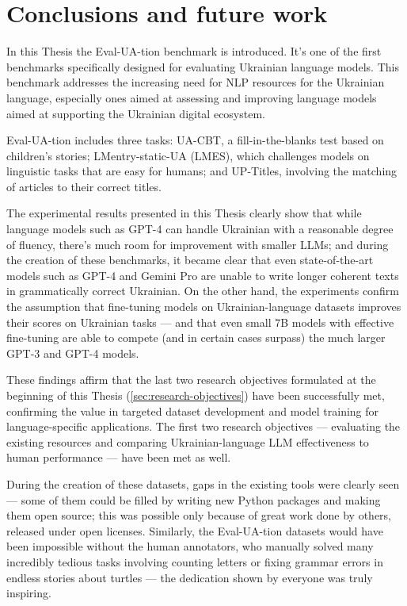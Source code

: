 \chapter{Conclusions and future work}\label{conclusion}
In this Thesis the Eval-UA-tion benchmark is introduced. It's one of the first
benchmarks specifically designed for evaluating Ukrainian language models. 
This benchmark addresses the increasing need for NLP resources for the Ukrainian language, especially ones aimed at assessing and improving language models aimed at supporting the Ukrainian digital ecosystem.

Eval-UA-tion includes three tasks: UA-CBT, a fill-in-the-blanks test based on children's stories; LMentry-static-UA (LMES), which challenges models on linguistic tasks that are easy for humans; and UP-Titles, involving the matching of articles to their correct titles. 

The experimental results presented in this Thesis clearly show that while language models such as GPT-4 can handle Ukrainian with a reasonable degree of fluency, there's much room for improvement with smaller LLMs; and during the creation of these benchmarks, it became clear that even state-of-the-art models such as GPT-4 and Gemini Pro are unable to write longer coherent texts in grammatically correct Ukrainian. 
On the other hand, the experiments confirm the assumption that fine-tuning models on Ukrainian-language datasets improves their scores on Ukrainian tasks — 
and that even small 7B models with effective fine-tuning are able to compete (and in certain cases surpass) the much larger GPT-3 and GPT-4 models. %

These findings affirm that the last two research objectives formulated at the beginning of this Thesis (\autoref{sec:research-objectives}) have been successfully met, confirming the value in targeted dataset development and model training for language-specific applications. The first two research objectives — evaluating the existing resources and comparing Ukrainian-language LLM effectiveness to human performance — have been met as well.

During the creation of these datasets, gaps in the existing tools were clearly seen — some of them could be filled by writing new Python packages and making them open source; this was possible only because of great work done by others, released under open licenses.
Similarly, the Eval-UA-tion datasets would have been impossible without the human annotators, who manually solved many incredibly tedious tasks involving counting letters or fixing grammar errors in endless stories about turtles — the dedication shown by everyone was truly inspiring.

